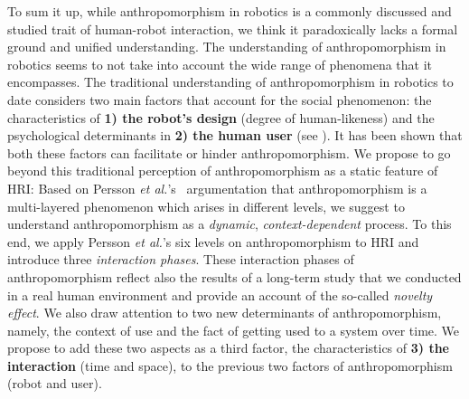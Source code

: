 \documentclass{frontiersSCNS} %
\begin{document}
To sum it up, while anthropomorphism in robotics is a commonly discussed and
studied trait of human-robot interaction, we think it paradoxically lacks a
formal ground and unified understanding. The understanding of anthropomorphism
in robotics seems to not take into account the wide range of phenomena that it
encompasses. The traditional understanding of anthropomorphism in robotics to
date considers two main factors that account for the social phenomenon: the
characteristics of \textbf{1) the robot's design} (degree of human-likeness) and
the psychological determinants in \textbf{2) the human user} (see
\cite{epley_seeing_2007}). It has been shown that both these factors can
facilitate or hinder anthropomorphism. We propose to go beyond this traditional
perception of anthropomorphism as a static feature of HRI: Based on Persson
\textit{et al.}'s~\cite{persson_anthropomorphism_2000} argumentation that
anthropomorphism is a multi-layered phenomenon which arises in different levels,
we suggest to understand anthropomorphism as a \emph{dynamic},
\emph{context-dependent} process. To this end, we apply Persson \textit{et
al.}'s six levels on anthropomorphism to HRI and introduce three
\emph{interaction phases}. These interaction phases of anthropomorphism reflect
also the results of a long-term study that we conducted in a real human
environment and provide an account of the so-called \textit{novelty effect}. We
also draw attention to two new determinants of anthropomorphism, namely, the
context of use and the fact of getting used to a system over time. We propose to
add these two aspects as a third factor, the characteristics of \textbf{3) the
interaction} (time and space), to the previous two factors of anthropomorphism
(robot and user). 


\end{document}

